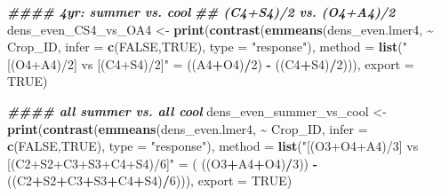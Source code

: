 \documentclass[
]{article}
\newenvironment{Shaded}{\begin{snugshade}}{\end{snugshade}}
\newcommand{\AttributeTok}[1]{\textcolor[rgb]{0.13,0.29,0.53}{#1}}
\newcommand{\ConstantTok}[1]{\textcolor[rgb]{0.56,0.35,0.01}{#1}}
\newcommand{\DecValTok}[1]{\textcolor[rgb]{0.00,0.00,0.81}{#1}}
\newcommand{\DocumentationTok}[1]{\textcolor[rgb]{0.56,0.35,0.01}{\textbf{\textit{#1}}}}
\newcommand{\FunctionTok}[1]{\textcolor[rgb]{0.13,0.29,0.53}{\textbf{#1}}}
\newcommand{\NormalTok}[1]{#1}
\newcommand{\OtherTok}[1]{\textcolor[rgb]{0.56,0.35,0.01}{#1}}
\newcommand{\SpecialCharTok}[1]{\textcolor[rgb]{0.81,0.36,0.00}{\textbf{#1}}}
\newcommand{\StringTok}[1]{\textcolor[rgb]{0.31,0.60,0.02}{#1}}
\begin{document}
\begin{Shaded}
\begin{Highlighting}[]
\DocumentationTok{\#\#\#\# 4yr: summer vs. cool}
\DocumentationTok{\#\# (C4+S4)/2 vs. (O4+A4)/2 }
\NormalTok{dens\_even\_CS4\_vs\_OA4 }\OtherTok{\textless{}{-}} \FunctionTok{print}\NormalTok{(}\FunctionTok{contrast}\NormalTok{(}\FunctionTok{emmeans}\NormalTok{(dens\_even.lmer4, }\SpecialCharTok{\textasciitilde{}}\NormalTok{ Crop\_ID,}
                                               \AttributeTok{infer =} \FunctionTok{c}\NormalTok{(}\ConstantTok{FALSE}\NormalTok{,}\ConstantTok{TRUE}\NormalTok{),}
                                               \AttributeTok{type =} \StringTok{"response"}\NormalTok{),}
                                       \AttributeTok{method =} \FunctionTok{list}\NormalTok{(}\StringTok{"[(O4+A4)/2] vs [(C4+S4)/2]"} \OtherTok{=}
\NormalTok{                                                       ((A4}\SpecialCharTok{+}\NormalTok{O4)}\SpecialCharTok{/}\DecValTok{2}\NormalTok{) }\SpecialCharTok{{-}}\NormalTok{ ((C4}\SpecialCharTok{+}\NormalTok{S4)}\SpecialCharTok{/}\DecValTok{2}\NormalTok{))),}
                              \AttributeTok{export =} \ConstantTok{TRUE}\NormalTok{)}

\DocumentationTok{\#\#\#\# all summer vs. all cool}
\NormalTok{dens\_even\_summer\_vs\_cool }\OtherTok{\textless{}{-}} \FunctionTok{print}\NormalTok{(}\FunctionTok{contrast}\NormalTok{(}\FunctionTok{emmeans}\NormalTok{(dens\_even.lmer4, }\SpecialCharTok{\textasciitilde{}}\NormalTok{ Crop\_ID,}
                                                   \AttributeTok{infer =} \FunctionTok{c}\NormalTok{(}\ConstantTok{FALSE}\NormalTok{,}\ConstantTok{TRUE}\NormalTok{), }
                                                   \AttributeTok{type =} \StringTok{"response"}\NormalTok{),}
                                           \AttributeTok{method =} \FunctionTok{list}\NormalTok{(}\StringTok{"[(O3+O4+A4)/3] vs [(C2+S2+C3+S3+C4+S4)/6]"} \OtherTok{=}
\NormalTok{                                                           ( ((O3}\SpecialCharTok{+}\NormalTok{A4}\SpecialCharTok{+}\NormalTok{O4)}\SpecialCharTok{/}\DecValTok{3}\NormalTok{)) }\SpecialCharTok{{-}}\NormalTok{ ((C2}\SpecialCharTok{+}\NormalTok{S2}\SpecialCharTok{+}\NormalTok{C3}\SpecialCharTok{+}\NormalTok{S3}\SpecialCharTok{+}\NormalTok{C4}\SpecialCharTok{+}\NormalTok{S4)}\SpecialCharTok{/}\DecValTok{6}\NormalTok{))),}
                                  \AttributeTok{export =} \ConstantTok{TRUE}\NormalTok{)}


\end{Highlighting}
\end{Shaded}
\end{document}
